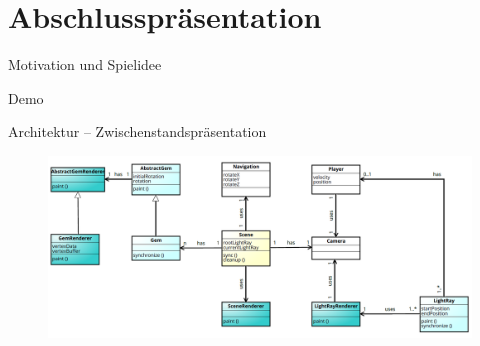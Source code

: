 

\subtitle{Game Programming}



\slidetitle
\section*{Abschlusspräsentation}

\begin{frame}{Motivation und Spielidee}

\end{frame}

\begin{frame}{Demo}
	\centering
\end{frame}

\begin{frame}{Architektur -- Zwischenstandspräsentation}
	\begin{figure}
		\centering
		\includegraphics[width=\textwidth, height=\textheight, keepaspectratio]{images/klassendiagramm}
	\end{figure}
\end{frame}

